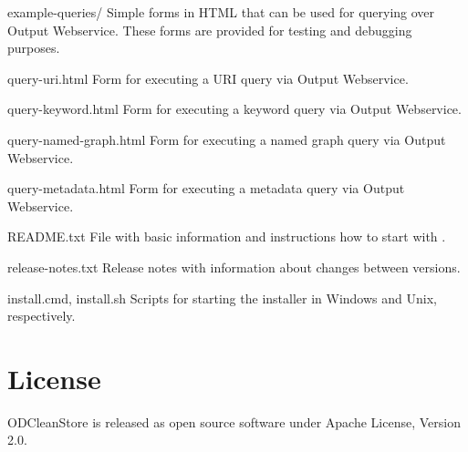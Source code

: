\begin{dirlistbrief}
    \item[example-queries/] Simple forms in HTML that can be used for querying over Output Webservice. These forms are provided for testing and debugging purposes.
        \begin{dirlist}
            \item[query-uri.html] Form for executing a URI query via Output Webservice.
            \item[query-keyword.html] Form for executing a keyword query via Output Webservice.
            \item[query-named-graph.html] Form for executing a named graph query via Output Webservice.
            \item[query-metadata.html] Form for executing a metadata query via Output Webservice.
        \end{dirlist}
   \item[README.txt] File with basic information and instructions how to start with \odcs.
   \item[release-notes.txt] Release notes with information about changes between versions.
   \item[install.cmd, install.sh] Scripts for starting the installer in Windows and Unix, respectively.
\end{dirlistbrief}

\chapter{License}
ODCleanStore is released as open source software under Apache License, Version 2.0.

